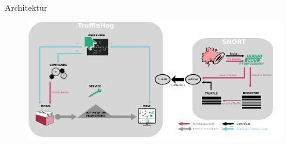 \begin{frame}{Architektur}
    \begin{figure}
    	\centering
    	\includegraphics[width=\textwidth]{./images/arch/14.pdf}
    \end{figure}
\end{frame}
